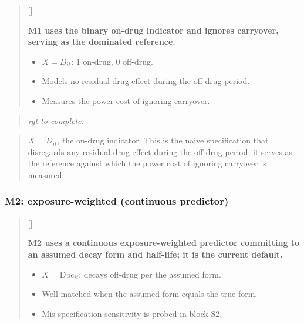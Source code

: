 \documentclass[
  11pt,
]{article}
\newcounter{pgraph}
\newenvironment{bullets}{%
  \stepcounter{pgraph}%
  \begin{quote}\small\sffamily\color[gray]{0.30}%
  {\normalfont\scriptsize\color[gray]{0.58}[\thepgraph]\enspace}}{%
  \end{quote}}
\newenvironment{rgt}{%
  \begin{quote}\small\itshape\color[RGB]{20,60,160}}{%
  \end{quote}}
\newenvironment{orig}{%
  \begin{quote}\normalsize\color[gray]{0.55}}{%
  \end{quote}}
\begin{document}
\begin{bullets}

\textbf{M1 uses the binary on-drug indicator and ignores carryover,
serving as the dominated reference.}

\begin{itemize}\setlength{\itemsep}{2pt}\setlength{\parskip}{0pt}
\item $X = D_{it}$: 1 on-drug, 0 off-drug.
\item Models no residual drug effect during the off-drug period.
\item Measures the power cost of ignoring carryover.
\end{itemize}

\end{bullets}

\begin{rgt}
rgt to complete.

\end{rgt}

\begin{orig}
\(X = D_{it}\), the on-drug indicator. This is the naive
specification that disregards any residual drug effect during
the off-drug period; it serves as the reference against which the power cost
of ignoring carryover is measured.

\end{orig}

\subsubsection{M2: exposure-weighted (continuous predictor)}\label{m2-exposure-weighted-continuous-predictor}

\begin{bullets}

\textbf{M2 uses a continuous exposure-weighted predictor committing
to an assumed decay form and half-life; it is the current default.}

\begin{itemize}\setlength{\itemsep}{2pt}\setlength{\parskip}{0pt}
\item $X = \text{Dbc}_{it}$: decays off-drug per the assumed form.
\item Well-matched when the assumed form equals the true form.
\item Mis-specification sensitivity is probed in block S2.
\end{itemize}

\end{bullets}
\end{document}

